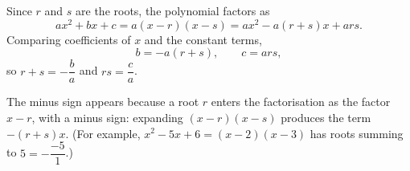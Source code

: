 Since $r$ and $s$ are the roots, the polynomial factors as
\[
ax^2+bx+c=a(x-r)(x-s)=ax^2-a(r+s)x+ars .
\]
Comparing coefficients of $x$ and the constant terms,
\[
b=-a(r+s),\qquad c=ars,
\]
so $\boxed{r+s=-\dfrac {b}{a}}$ and $\boxed{rs=\dfrac {c}{a}}$.

The minus sign appears because a root $r$ enters the factorisation as the factor $x-r$, with a minus sign: expanding $(x-r)(x-s)$ produces the term $-(r+s)x$. (For example, $x^2-5x+6=(x-2)(x-3)$ has roots summing to $5=-\dfrac{-5}{1}$.)
